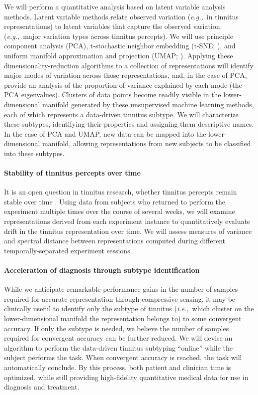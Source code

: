 \documentclass[11pt, notitlepage]{article} %
\def\eg{{\emph{e.g.,}}~}
\def\ie{{\emph{i.e.,}}~}
\begin{document}
We will perform a quantitative analysis based on latent variable analysis methods.
Latent variable methods relate observed variation (\eg in tinnitus representations)
to latent variables that capture the observed variation (\eg major variation types across tinnitus percepts).
We will use principle component analysis (PCA), t-stochastic neighbor embedding (t-SNE; \cite{vandermaatenBarnesHutSNE2013}),
and uniform manifold approximation and projection (UMAP; \cite{mcinnesUMAPUniformManifold2020}).
Applying these dimensionality-reduction algorithms to a collection of representations
will identify major modes of variation across those representations,
and, in the case of PCA, provide an analysis of the proportion of variance explained by each mode
(the PCA eigenvalues).
Clusters of data points become readily visible in the lower-dimensional manifold generated
by these unsupervised machine learning methods, each of which represents
a data-driven tinnitus subtype.
We will characterize these subtypes, identifying their properties and assigning them descriptive names.
In the case of PCA and UMAP, new data can be mapped into the lower-dimensional manifold,
allowing representations from new subjects to be classified into these subtypes.

\paragraph{Stability of tinnitus percepts over time}

It is an open question in tinnitus research, whether tinnitus percepts remain stable over time
\cite{husainReplicabilityNeuralBehavioral2019}.
Using data from subjects who returned to perform the experiment multiple times
over the course of several weeks,
we will examine representations derived from each experiment instance
to quantitatively evaluate drift in the tinnitus representation over time.
We will assess measures of variance and spectral distance between representations
computed during different temporally-separated experiment sessions.

\paragraph{Acceleration of diagnosis through subtype identification}

While we anticipate remarkable performance gains in the number of samples required for accurate representation
through compressive sensing,
it may be clinically useful to identify only the subtype of tinnitus
(\ie which cluster on the lower-dimensional manifold the representation belongs to)
to some convergent accuracy.
If only the subtype is needed,
we believe the number of samples required for convergent accuracy can be further reduced.
We will devise an algorithm to perform the data-driven tinnitus subtyping ``online''
while the subject performs the task.
When convergent accuracy is reached, the task will automatically conclude.
By this process, both patient and clinician time is optimized, while still providing high-fidelity quantitative medical data
for use in diagnosis and treatment.
\end{document}
